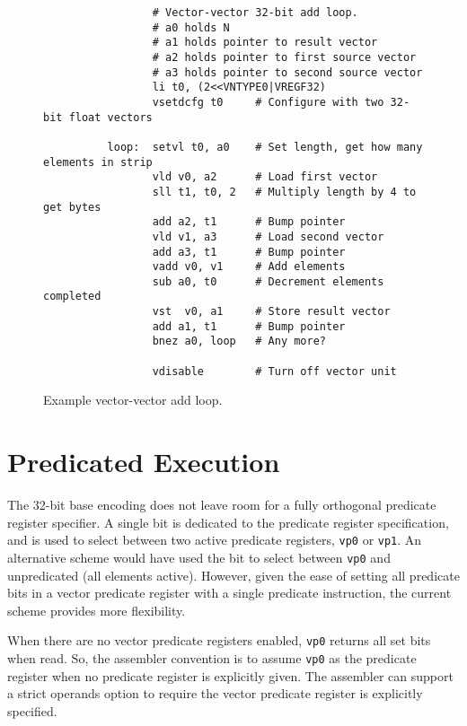 \begin{figure}[bt]
  \centering
\begin{verbatim}
                 # Vector-vector 32-bit add loop.
                 # a0 holds N
                 # a1 holds pointer to result vector
                 # a2 holds pointer to first source vector
                 # a3 holds pointer to second source vector
                 li t0, (2<<VNTYPE0|VREGF32)
                 vsetdcfg t0     # Configure with two 32-bit float vectors

          loop:  setvl t0, a0    # Set length, get how many elements in strip
                 vld v0, a2      # Load first vector
                 sll t1, t0, 2   # Multiply length by 4 to get bytes
                 add a2, t1      # Bump pointer
                 vld v1, a3      # Load second vector
                 add a3, t1      # Bump pointer
                 vadd v0, v1     # Add elements
                 sub a0, t0      # Decrement elements completed
                 vst  v0, a1     # Store result vector
                 add a1, t1      # Bump pointer
                 bnez a0, loop   # Any more?

                 vdisable        # Turn off vector unit
\end{verbatim}
\caption{Example vector-vector add loop.}
\label{fig:vvadd}
\end{figure}

\section{Predicated Execution}


\begin{commentary}
  The 32-bit base encoding does not leave room for a fully orthogonal
  predicate register specifier.  A single bit is dedicated to the
  predicate register specification, and is used to select between two
  active predicate registers, {\tt vp0} or {\tt vp1}. An alternative
  scheme would have used the bit to select between {\tt vp0} and
  unpredicated (all elements active).  However, given the ease of
  setting all predicate bits in a vector predicate register with a
  single predicate instruction, the current scheme provides more
  flexibility.

  When there are no vector predicate registers enabled, {\tt vp0}
  returns all set bits when read.  So, the assembler convention is to
  assume {\tt vp0} as the predicate register when no predicate
  register is explicitly given.  The assembler can support a strict
  operands option to require the vector predicate register is
  explicitly specified.
\end{commentary}

